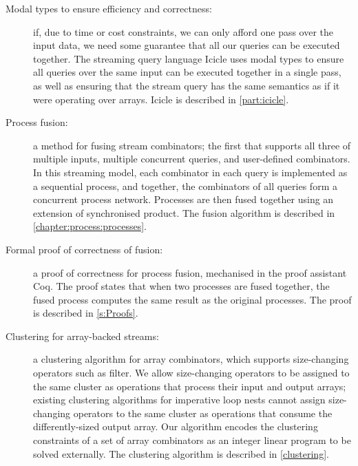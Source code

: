 \begin{description}
\item[Modal types to ensure efficiency and correctness:]
if, due to time or cost constraints, we can only afford one pass over the input data, we need some guarantee that all our queries can be executed together.
The streaming query language Icicle uses modal types to ensure all queries over the same input can be executed together in a single pass, as well as ensuring that the stream query has the same semantics as if it were operating over arrays.
Icicle is described in \cref{part:icicle}.


\item[Process fusion:]
a method for fusing stream combinators; the first that supports all three of multiple inputs, multiple concurrent queries, and user-defined combinators.
In this streaming model, each combinator in each query is implemented as a sequential process, and together, the combinators of all queries form a concurrent process network.
Processes are then fused together using an extension of synchronised product.
The fusion algorithm is described in \cref{chapter:process:processes}.

\item[Formal proof of correctness of fusion:]
a proof of correctness for process fusion, mechanised in the proof assistant Coq.
The proof states that when two processes are fused together, the fused process computes the same result as the original processes.
The proof is described in \cref{s:Proofs}.

\item[Clustering for array-backed streams:]
a clustering algorithm for array combinators, which supports size-changing operators such as filter.
We allow size-changing operators to be assigned to the same cluster as operations that process their input and output arrays; existing clustering algorithms for imperative loop nests cannot assign size-changing operators to the same cluster as operations that consume the differently-sized output array.
Our algorithm encodes the clustering constraints of a set of array combinators as an integer linear program to be solved externally.
The clustering algorithm is described in \cref{clustering}.

\end{description}

